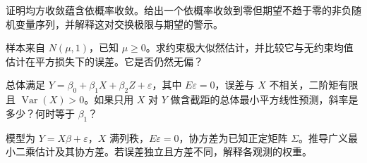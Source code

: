 \begin{exercise}[三种收敛之间的辨析]\label{q:B17.21}
证明均方收敛蕴含依概率收敛。给出一个依概率收敛到零但期望不趋于零的非负随机变量序列，并解释这对交换极限与期望的警示。\par{}\end{exercise}

\begin{exercise}[参数空间约束下的正态估计]\label{q:B17.22}
样本来自 $N(\mu,1)$，已知 $\mu\ge0$。求约束极大似然估计，并比较它与无约束均值估计在平方损失下的误差。它是否仍然无偏？\par{}\end{exercise}

\begin{exercise}[遗漏变量导致斜率变化]\label{q:B17.23}
总体满足 $Y=\beta_0+\beta_1X+\beta_2Z+\varepsilon$，其中 $E\varepsilon=0$，误差与 $X$ 不相关，二阶矩有限且 $\operatorname{Var}(X)>0$。如果只用 $X$ 对 $Y$ 做含截距的总体最小平方线性预测，斜率是多少？何时等于 $\beta_1$？\par{}\end{exercise}

\begin{exercise}[加权最小二乘]\label{q:B17.24}
模型为 $Y=X\beta+\varepsilon$，$X$ 满列秩，$E\varepsilon=0$，协方差为已知正定矩阵 $\Sigma$。推导广义最小二乘估计及其协方差。若误差独立且方差不同，解释各观测的权重。\par{}\end{exercise}

\clearpage